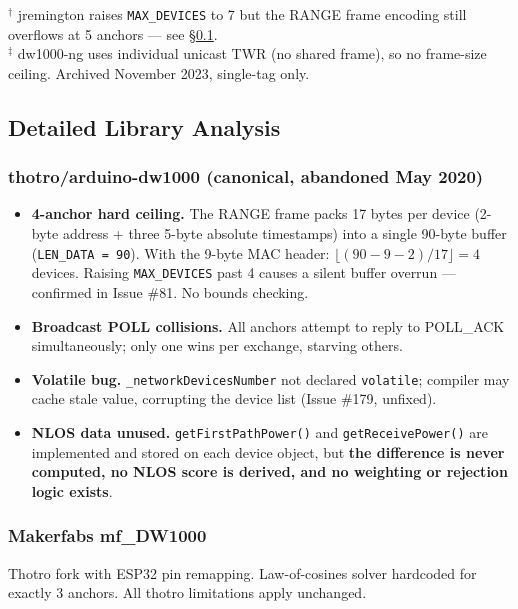 \documentclass[11pt,a4paper]{article}
\begin{document}
\begin{footnotesize}
$^\dagger$ jremington raises \texttt{MAX\_DEVICES} to 7 but the RANGE frame encoding still overflows at 5 anchors --- see \S\ref{sec:libdetail}.\\
$^\ddagger$ dw1000-ng uses individual unicast TWR (no shared frame), so no frame-size ceiling. Archived November 2023, single-tag only.
\end{footnotesize}

\subsection{Detailed Library Analysis}
\label{sec:libdetail}

\subsubsection{thotro/arduino-dw1000 (canonical, abandoned May 2020)}

\begin{itemize}[leftmargin=2em]
  \item \textbf{4-anchor hard ceiling.} The RANGE frame packs 17 bytes per device (2-byte address + three 5-byte absolute timestamps) into a single 90-byte buffer (\texttt{LEN\_DATA = 90}). With the 9-byte MAC header: $\lfloor(90-9-2)/17\rfloor = 4$ devices. Raising \texttt{MAX\_DEVICES} past 4 causes a silent buffer overrun --- confirmed in Issue \#81. No bounds checking.
  \item \textbf{Broadcast POLL collisions.} All anchors attempt to reply to POLL\_ACK simultaneously; only one wins per exchange, starving others.
  \item \textbf{Volatile bug.} \texttt{\_networkDevicesNumber} not declared \texttt{volatile}; compiler may cache stale value, corrupting the device list (Issue \#179, unfixed).
  \item \textbf{NLOS data unused.} \texttt{getFirstPathPower()} and \texttt{getReceivePower()} are implemented and stored on each device object, but \textbf{the difference is never computed, no NLOS score is derived, and no weighting or rejection logic exists}.
\end{itemize}

\subsubsection{Makerfabs mf\_DW1000}
Thotro fork with ESP32 pin remapping. Law-of-cosines solver hardcoded for exactly 3 anchors. All thotro limitations apply unchanged.
\end{document}
